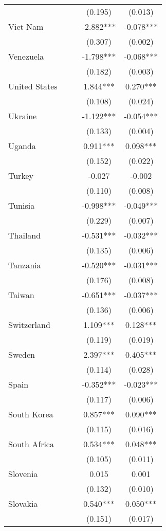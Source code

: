 \documentclass[]{article}
\begin{document}
\begin{tabular}{lcccc}
 &  &  & (0.195) & (0.013) \\
Viet Nam &  &  & -2.882*** & -0.078*** \\
 &  &  & (0.307) & (0.002) \\
Venezuela &  &  & -1.798*** & -0.068*** \\
 &  &  & (0.182) & (0.003) \\
United States &  &  & 1.844*** & 0.270*** \\
 &  &  & (0.108) & (0.024) \\
Ukraine &  &  & -1.122*** & -0.054*** \\
 &  &  & (0.133) & (0.004) \\
Uganda &  &  & 0.911*** & 0.098*** \\
 &  &  & (0.152) & (0.022) \\
Turkey &  &  & -0.027 & -0.002 \\
 &  &  & (0.110) & (0.008) \\
Tunisia &  &  & -0.998*** & -0.049*** \\
 &  &  & (0.229) & (0.007) \\
Thailand &  &  & -0.531*** & -0.032*** \\
 &  &  & (0.135) & (0.006) \\
Tanzania &  &  & -0.520*** & -0.031*** \\
 &  &  & (0.176) & (0.008) \\
Taiwan &  &  & -0.651*** & -0.037*** \\
 &  &  & (0.136) & (0.006) \\
Switzerland &  &  & 1.109*** & 0.128*** \\
 &  &  & (0.119) & (0.019) \\
Sweden &  &  & 2.397*** & 0.405*** \\
 &  &  & (0.114) & (0.028) \\
Spain &  &  & -0.352*** & -0.023*** \\
 &  &  & (0.117) & (0.006) \\
South Korea &  &  & 0.857*** & 0.090*** \\
 &  &  & (0.115) & (0.016) \\
South Africa &  &  & 0.534*** & 0.048*** \\
 &  &  & (0.105) & (0.011) \\
Slovenia &  &  & 0.015 & 0.001 \\
 &  &  & (0.132) & (0.010) \\
Slovakia &  &  & 0.540*** & 0.050*** \\
 &  &  & (0.151) & (0.017) \\

\end{tabular}
\end{document}
